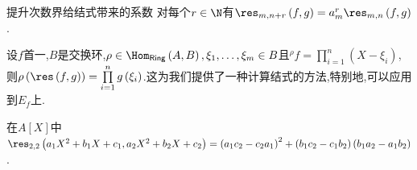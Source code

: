 \begin{corollary}{提升次数界给结式带来的系数}{}
	对每个$r\in\N$有$\res_{m,n+r}\left(f,g\right)=a_{m}^{r}\res_{m,n}\left(f,g\right)$.
\end{corollary}

\begin{remark}{}{}
	设$f$首一,$B$是交换环,$\rho\in\Hom_{\mathsf{Ring}}\left(A,B\right),\xi_{1},\ldots,\xi_{m}\in B$且$^{\rho}f=\prod\limits_{i=1}^{n}\left(X-\xi_{i}\right)$,则$\rho\left(\res\left(f,g\right)\right)=\prod\limits_{i=1}^{n}g\left(\xi_{i}\right)$.这为我们提供了一种计算结式的方法,特别地,可以应用到$E_{f}$上.
\end{remark}

\begin{example}{}{}
	在$A[X]$中$\res_{2,2}\left(a_{1}X^{2}+b_{1}X+c_{1},a_{2}X^{2}+b_{2}X+c_{2}\right)=\left(a_{1}c_{2}-c_{2}a_{1}\right)^{2}+\left(b_{1}c_{2}-c_{1}b_{2}\right)\left(b_{1}a_{2}-a_{1}b_{2}\right)$.
\end{example}










